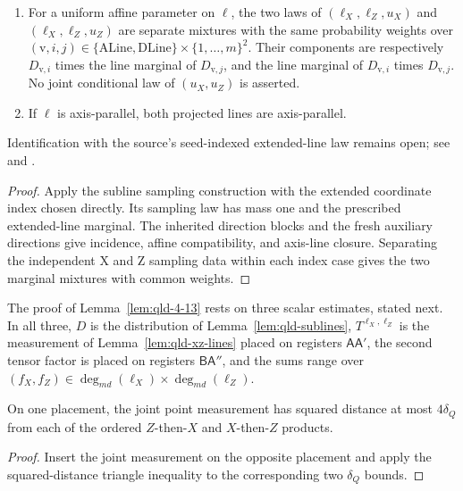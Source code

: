 \begin{lemma}
\begin{enumerate}
		\item For a uniform affine parameter on $\ell$, the two laws of
		$(\ell_X,\ell_Z,u_X)$ and $(\ell_X,\ell_Z,u_Z)$ are separate
		mixtures with the same probability weights over
		$(\mathrm{v},i,j)\in\{\mathrm{ALine},\mathrm{DLine}\}
		\times\{1,\ldots,m\}^2$. Their components are respectively
		$D_{\mathrm{v},i}$ times the line marginal of $D_{\mathrm{v},j}$,
		and the line marginal of $D_{\mathrm{v},i}$ times
		$D_{\mathrm{v},j}$. No joint conditional law of $(u_X,u_Z)$ is asserted.
		\item If $\ell$ is axis-parallel, both projected lines are axis-parallel.
	\end{enumerate}
	Identification with the source's seed-indexed extended-line law remains
	open; see \cite{gap:qpbt_subline-claims-line-marginal} and
	\cite{gap:qpbt_ld-dimension-divisibility}.
\end{lemma}
\begin{proof}
	\leanok
	Apply the subline sampling construction with the extended coordinate
	index chosen directly. Its sampling law has mass one and the prescribed
	extended-line marginal. The inherited direction blocks and the fresh
	auxiliary directions give incidence, affine compatibility, and axis-line
	closure. Separating the independent X and Z sampling data within each
	index case gives the two marginal mixtures with common weights.
\end{proof}

The proof of Lemma~\ref{lem:qld-4-13} rests on three scalar estimates, stated
next. In all three, $D$ is the distribution
of Lemma~\ref{lem:qld-sublines},
$T^{\ell_X,\ell_Z}$ is the measurement of Lemma~\ref{lem:qld-xz-lines} placed
on registers $\mathsf{A}\mathsf{A}'$, the second tensor factor is placed on
registers $\mathsf{B}\mathsf{A}''$, and the sums range over
$(f_X, f_Z) \in \deg_{md}(\ell_X) \times \deg_{md}(\ell_Z)$.

\begin{lemma}
	\label{lem:qld-4-10-same-placement}
	\leanok
	On one placement, the joint point measurement has squared distance at most
	$4\delta_Q$ from each of the ordered $Z$-then-$X$ and $X$-then-$Z$
	products.
\end{lemma}
\begin{proof}
	\leanok
	Insert the joint measurement on the opposite placement and apply the
	squared-distance triangle inequality to the corresponding two
	$\delta_Q$ bounds.
\end{proof}

